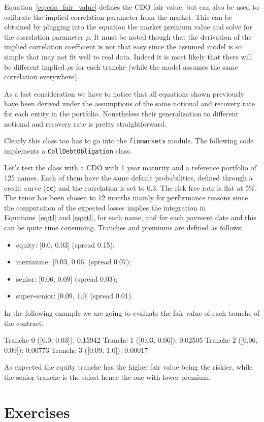 Equation~\ref{eq:cdo_fair_value} defines the CDO fair value, but can also be used to calibrate the implied correlation parameter from the market. This can be obtained by plugging into the equation the market premium value and solve for the correlation parameter $\rho$. It must be noted though that the derivation of the implied correlation coefficient is not that easy since the assumed model is so simple that may not fit well to real data. Indeed it is most likely that there will be different implied $\rho$s for each tranche (while the model assumes the same correlation everywhere).

As a last consideration we have to notice that all equations shown previously have been derived under the assumptions of the same notional and recovery rate for each entity in the portfolio. Nonetheless their generalization to different notional and recovery rate is pretty straightforward.
 
\begin{finmarkets}
Clearly this class too has to go into the \texttt{finmarkets} module. The following code implements a \texttt{CollDebtObligation} class.
\end{finmarkets}


Let's test the class with a CDO with 1 year maturity and a reference portfolio of 125 names. Each of them have the same default probabilities, defined through a credit curve (\texttt{cc}) and the correlation is set to 0.3. The risk free rate is flat at 5\%. The tenor has been chosen to 12 months mainly for performance reasons since the computation of the expected losses implies the integration in Equations~\ref{eq:tl} and \ref{eq:etl}, for each name, and for each payment date and this can be quite time consuming.
Tranches and premiums are defined as follows:
\begin{itemize}
	\item equity: [0.0, 0.03] (spread 0.15);
	\item mezzanine: [0.03, 0.06] (spread 0.07);
	\item senior: [0.06, 0.09] (spread 0.03);
	\item super-senior: [0.09, 1.0] (spread 0.01).
\end{itemize}

In the following example we are going to evaluate the fair value of each tranche of the contract.


\begin{ioutput}
Tranche 0 ([0.0, 0.03]): 0.15942
Tranche 1 ([0.03, 0.06]): 0.02505
Tranche 2 ([0.06, 0.09]): 0.00773
Tranche 3 ([0.09, 1.0]): 0.00017
\end{ioutput}

As expected the equity tranche has the higher fair value being the riskier, while the senior tranche is the safest hence the one with lower premium.

\section*{Exercises}


